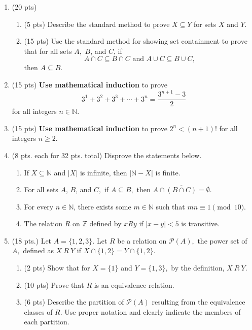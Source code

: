 \documentclass[11pt]{article}
\newcommand{\Z}{{\mathbb{Z}}}
\newcommand{\N}{{\mathbb{N}}}
\begin{document}
\newpage
\begin{enumerate}
\item (20 pts) 
	\begin{enumerate}
	\item (5 pts) Describe the standard method to prove $X \subseteq Y$ for sets $X$ and $Y$.
	\vspace{1in}
	\item (15 pts) Use the standard method for showing set containment to prove that for all sets $A,$ $B$, and $C$, if $$A\cap C \subseteq B \cap C \text{   and   } A\cup C \subseteq B \cup C,$$
	then $A \subseteq B.$
	\end{enumerate}
\newpage
\item (15 pts) \textbf{Use mathematical induction} to prove $$3^1+3^2+3^3 + \cdots + 3^n = \frac{3^{n+1}-3}{2}$$ for all integers $n \in \N.$
\newpage
\item (15 pts) \textbf{Use mathematical induction} to prove $2^n < (n+1)!$ for all integers $n \geq 2.$
\newpage
\item (8 pts. each for 32 pts. total) Disprove the statements below.
	\begin{enumerate}
	\item If $X \subseteq \N$ and $|X|$ is infinite, then $|\N-X|$ is finite.
	\vfill
	\item For all sets $A$, $B$, and $C,$ if $A \subseteq B,$ then $A \cap \overline{(B \cap C)}=\emptyset.$
	\vfill
	\item For every $n \in \N$, there exists some $m \in \N$ such that $mn \equiv 1 \pmod {10}.$
	\vfill
	\item The relation $R$ on $\Z$ defined by $xRy$ if $|x-y| <5$ is transitive.
	\vfill
	\end{enumerate}
	\newpage
\item (18 pts.) Let $A=\{1,2,3\}.$ Let $R$ be a relation on $\mathcal{P}(A),$ the power set of $A,$ defined as $X\: R\: Y$ if $X \cap \{1,2\} = Y \cap \{1,2\}.$
	\begin{enumerate}
	\item (2 pts) Show that for $X=\{1\}$ and $Y=\{1,3\},$ by the definition, $X\: R\: Y.$
	\vspace{1in}
	\item (10 pts) Prove that $R$ is an equivalence relation.
	\vfill
	\vfill
	\item (6 pts) Describe the partition of $\mathcal{P}(A)$ resulting from the equivalence classes of $R.$ Use proper notation and clearly indicate the members of each partition.
	\vfill
	\end{enumerate}
\end{enumerate}
\end{document}
